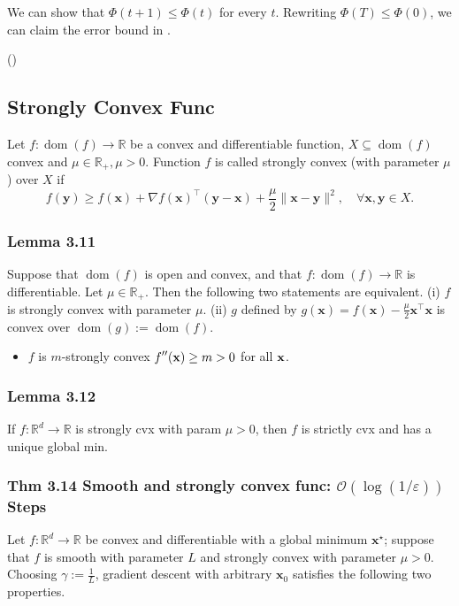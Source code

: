 We can show that $\Phi(t+1) \leq \Phi(t)$ for every $t$. Rewriting $\Phi(T) \leq \Phi(0)$, we can claim the error bound in . 

()


\subsection*{Strongly Convex Func}
Let $f: \operatorname{dom}(f) \rightarrow \mathbb{R}$ be a convex and differentiable function, $X \subseteq \operatorname{dom}(f)$ convex and $\mu \in \mathbb{R}_{+}, \mu>0$. Function $f$ is called strongly convex (with parameter $\mu$ ) over $X$ if
$$
f(\mathbf{y}) \geq f(\mathbf{x})+\nabla f(\mathbf{x})^{\top}(\mathbf{y}-\mathbf{x})+\frac{\mu}{2}\|\mathbf{x}-\mathbf{y}\|^{2}, \quad \forall \mathbf{x}, \mathbf{y} \in X .
$$

\subsubsection*{Lemma 3.11}
Suppose that $\operatorname{dom}(f)$ is open and convex, and that $f: \operatorname{dom}(f) \rightarrow \mathbb{R}$ is differentiable. Let $\mu \in \mathbb{R}_{+}$. Then the following two statements are equivalent.
(i) $f$ is strongly convex with parameter $\mu$.
(ii) $g$ defined by $g(\mathbf{x})=f(\mathbf{x})-\frac{\mu}{2} \mathbf{x}^{\top} \mathbf{x}$ is convex over $\operatorname{dom}(g):=\operatorname{dom}(f)$.

\begin{itemize}[leftmargin=*]
    \item $f$ is $m$-strongly convex  ${\displaystyle f''(\operatorname{\boldsymbol{\mathbf{x}}})\geq m>0}$ for all $\operatorname{\boldsymbol{\mathbf{x}}}$.
\end{itemize}

\subsubsection*{Lemma 3.12}
If $f: \mathbb{R}^{d} \rightarrow \mathbb{R}$ is strongly cvx with param $\mu>0$, then $f$ is strictly cvx and has a unique global min.


\subsubsection*{Thm 3.14 Smooth and strongly convex func: $\mathcal{O}(\log (1 / \varepsilon))$ Steps}
Let $f: \mathbb{R}^{d} \rightarrow \mathbb{R}$ be convex and differentiable with a global minimum $\mathbf{x}^{\star}$; suppose that $f$ is smooth with parameter $L$ and strongly convex with parameter $\mu>0$. Choosing $\gamma:=\frac{1}{L}$, gradient descent with arbitrary $\mathbf{x}_{0}$ satisfies the following two properties.

